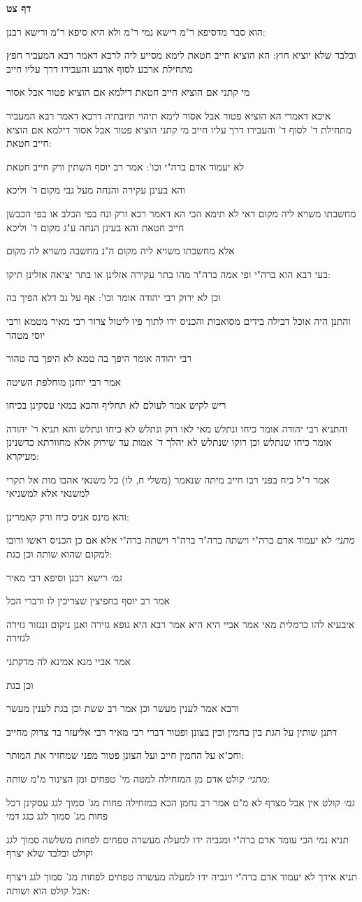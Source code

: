 \documentclass[12pt, openany]{book}
\newcommand{\sethebfont}{
\fontsize{10.5pt}{21.0pt} \selectfont
}
\newcommand{\textblock}[1]{
{\sethebfont #1\\}	
}
\newcommand{\sectname}{}
\newcommand{\newsection}[1]{
	\addcontentsline{toc}{section}{#1}
	\renewcommand{\sectname}{#1}	
	\vspace{-\baselineskip}
	\begin{center}
		\textbf{%
\fontsize{16pt}{16pt}\selectfont
			#1}
	\end{center}
	\vspace{-\baselineskip}
	\nopagebreak
}
\begin{document}
\newsection{דף צט}
\textblock{הוא סבר מדסיפא ר"מ רישא נמי ר"מ ולא היא סיפא ר"מ ורישא רבנן:}
\textblock{ובלבד שלא יוציא חוץ: הא הוציא חייב חטאת לימא מסייע ליה לרבא דאמר רבא המעביר חפץ מתחילת ארבע לסוף ארבע והעבירו דרך עליו חייב}
\textblock{מי קתני אם הוציא חייב חטאת דילמא אם הוציא פטור אבל אסור}
\textblock{איכא דאמרי הא הוציא פטור אבל אסור לימא תיהוי תיובתיה דרבא דאמר רבא המעביר מתחילת ד' לסוף ד' והעבירו דרך עליו חייב מי קתני הוציא פטור אבל אסור דילמא אם הוציא חייב חטאת:}
\textblock{לא יעמוד אדם ברה"י וכו': אמר רב יוסף השתין ורק חייב חטאת}
\textblock{והא בעינן עקירה והנחה מעל גבי מקום ד' וליכא}
\textblock{מחשבתו משויא ליה מקום דאי לא תימא הכי הא דאמר רבא זרק ונח בפי הכלב או בפי הכבשן חייב חטאת והא בעינן הנחה ע"ג מקום ד' וליכא}
\textblock{אלא מחשבתו משויא ליה מקום ה"נ מחשבה משויא לה מקום}
\textblock{בעי רבא הוא ברה"י ופי אמה ברה"ר מהו בתר עקירה אזלינן או בתר יציאה אזלינן תיקו:}
\textblock{וכן לא ירוק רבי יהודה אומר וכו': אף על גב דלא הפיך בה}
\textblock{והתנן היה אוכל דבילה בידים מסואבות והכניס ידו לתוך פיו ליטול צרור רבי מאיר מטמא ורבי יוסי מטהר}
\textblock{רבי יהודה אומר היפך בה טמא לא היפך בה טהור}
\textblock{אמר רבי יוחנן מוחלפת השיטה}
\textblock{ריש לקיש אמר לעולם לא תחליף והכא במאי עסקינן בכיחו}
\textblock{והתניא רבי יהודה אומר כיחו ונתלש מאי לאו רוק ונתלש לא כיחו ונתלש והא תניא ר' יהודה אומר כיחו שנתלש וכן רוקו שנתלש לא יהלך ד' אמות עד שירוק אלא מחוורתא כדשנינן מעיקרא:}
\textblock{אמר ר"ל כיח בפני רבו חייב מיתה שנאמר (משלי ח, לו) כל משנאי אהבו מות אל תקרי למשנאי אלא למשניאי}
\textblock{והא מינס אניס כיח ורק קאמרינן:}
\textblock{{\large\emph{מתני׳}} לא יעמוד אדם ברה"י וישתה ברה"ר ברה"ר וישתה ברה"י אלא אם כן הכניס ראשו ורובו למקום שהוא שותה וכן בגת:}
\textblock{{\large\emph{גמ׳}} רישא רבנן וסיפא רבי מאיר}
\textblock{אמר רב יוסף בחפיצין שצריכין לו ודברי הכל}
\textblock{איבעיא להו כרמלית מאי אמר אביי היא היא אמר רבא היא גופא גזירה ואנן ניקום ונגזור גזירה לגזירה}
\textblock{אמר אביי מנא אמינא לה מדקתני}
\textblock{וכן בגת}
\textblock{ורבא אמר לענין מעשר וכן אמר רב ששת וכן בגת לענין מעשר}
\textblock{דתנן שותין על הגת בין בחמין ובין בצונן ופטור דברי רבי מאיר רבי אליעזר בר צדוק מחייב}
\textblock{וחכ"א על החמין חייב ועל הצונן פטור מפני שמחזיר את המותר:}
\textblock{{\large\emph{מתני׳}} קולט אדם מן המזחילה למטה מי' טפחים ומן הצינור מ"מ שותה:}
\textblock{{\large\emph{גמ׳}} קולט אין אבל מצרף לא מ"ט אמר רב נחמן הכא במזחילה פחות מג' סמוך לגג עסקינן דכל פחות מג' סמוך לגג כגג דמי}
\textblock{תניא נמי הכי עומד אדם ברה"י ומגביה ידו למעלה מעשרה טפחים לפחות משלשה סמוך לגג וקולט ובלבד שלא יצרף}
\textblock{תניא אידך לא יעמוד אדם ברה"י ויגביה ידו למעלה מעשרה טפחים לפחות מג' סמוך לגג ויצרף אבל קולט הוא ושותה:}
\end{document}
